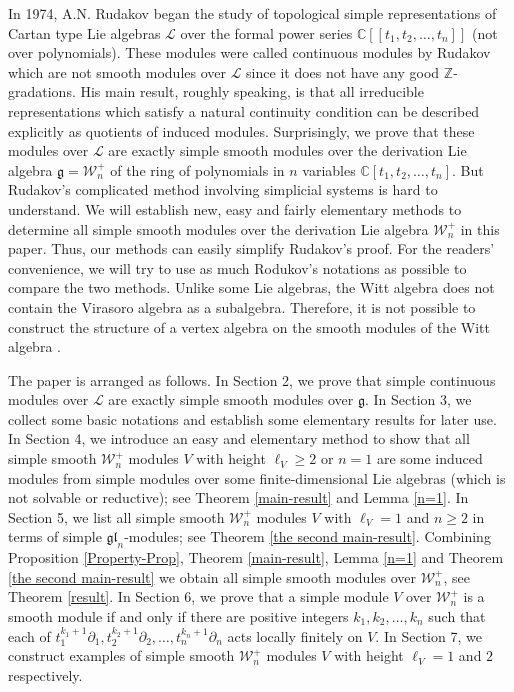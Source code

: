 \documentclass[12pt, a4paper]{amsart}
\newcommand{\C}{\mathbb{C}}
\def\gl{\mathfrak{gl}}
\theoremstyle{Theorem}
\theoremstyle{Theorem}
\numberwithin{equation}{section}
\begin{document}
In 1974,   A.N. Rudakov  \cite{R} began the study of topological simple representations of   Cartan type  Lie algebras $\mathcal{L}$ over the formal power series $\mathbb{C}[[t_{1},t_{2},\dots,t_{n}]]$ (not over polynomials). These modules were called continuous modules by Rudakov which are not smooth modules over  $\mathcal{L}$ since it does not have any good $\mathbb Z$-gradations. His main result, roughly speaking, is that all irreducible representations which satisfy a natural continuity condition can be described explicitly as quotients of induced modules.  Surprisingly, we prove that these modules over  $\mathcal{L}$ are exactly simple smooth modules over   the derivation Lie algebra $\mathfrak{g}=\mathcal{W}_{n}^{+}$ of the ring of polynomials in $n$ variables $\C[t_{1},t_{2},\dots,t_{n}]$. But Rudakov's  complicated  method involving simplicial  systems  is hard to understand.
We will establish
new, easy and  fairly  elementary methods to determine all
simple smooth modules over the derivation Lie algebra $\mathcal{W}_{n}^{+}$ in this paper. Thus, our methods  can easily  simplify  Rudakov's proof. For the readers' convenience, we will try to use as much Rodukov's notations as possible
to compare the two methods.  Unlike some Lie algebras, the Witt algebra does not contain the Virasoro algebra as a subalgebra. Therefore, it is not possible to construct the structure of a vertex algebra on the smooth modules of the Witt algebra \cite{L} .

The paper is arranged as follows. In Section 2, we prove that simple continuous modules   over  $\mathcal{L}$   are exactly simple smooth modules over $\mathfrak{g}$.
In Section 3, we collect some basic notations
and establish some elementary results for later use. In Section 4, we introduce an easy and elementary method to show that all simple smooth $\mathcal{W}_{n}^{+}$
modules $V$ with   height $\ell_V \geq 2$   {or $n=1$} are some induced modules from simple modules over some finite-dimensional  Lie algebras (which is not solvable or reductive); see Theorem \ref{main-result} and   {Lemma \ref{n=1}}. In Section 5, we list all simple smooth $\mathcal{W}_{n}^{+}$
modules $V$ with  $\ell_V =1$ and   {$n\geq2$} in terms of simple $\gl_n$-modules; see Theorem \ref{the second main-result}. Combining {Proposition \ref{Property-Prop}},  Theorem \ref{main-result}, {Lemma \ref{n=1}} and Theorem \ref{the second main-result} we obtain all simple smooth
modules over $\mathcal{W}_{n}^{+}$, see Theorem \ref{result}.
In Section 6, we prove that    a simple  module   $V$ over $\mathcal{W}_{n}^{+}$ is a smooth module if and only if there are positive integers $k_1,k_2,\dots,k_{n}$ such that each of 
$t_{1}^{k_{1}+1}\partial_{1},t_{2}^{k_{2}+1}\partial_{2},\dots,t_{n}^{k_{n}+1}\partial_{n}$
acts locally finitely on $V$.
In Section 7, we construct   examples of simple smooth $\mathcal{W}_{n}^{+}$ modules $V$ with   height $\ell_{V}=1$ and $2$ respectively.
\end{document}
